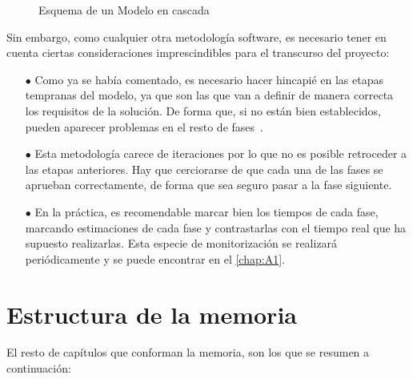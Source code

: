 \begin{figure}[h!]
\caption{Esquema de un Modelo en cascada} \label{fig:M1}
\end{figure}

Sin embargo, como cualquier otra metodología software, es necesario tener en cuenta ciertas consideraciones imprescindibles para el transcurso del proyecto:

\begin{itemize}
   \item[$\bullet$] Como ya se había comentado, es necesario hacer hincapié en las etapas tempranas del modelo, ya que son
   las que van a definir de manera correcta los requisitos de la solución. De forma que, si no están bien establecidos, pueden 
   aparecer problemas en el resto de fases~\cite{wiegers2013software}.
   \item[$\bullet$] Esta metodología carece de iteraciones por lo que no es posible retroceder a las etapas anteriores.
   Hay que cerciorarse de que cada una de las fases se aprueban correctamente, de forma que sea seguro pasar a la
   fase siguiente.
   \item[$\bullet$] En la práctica, es recomendable marcar bien los tiempos de cada fase, marcando estimaciones de cada fase y contrastarlas con
   el tiempo real que ha supuesto realizarlas. Esta especie de monitorización se realizará periódicamente y se puede encontrar 
   en el \autoref{chap:A1}.
\end{itemize}

\section{Estructura de la memoria} %

El resto de capítulos que conforman la memoria, son los que se resumen a continuación:

